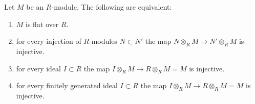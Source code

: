 \begin{lemma}
\label{lemma-flat}
Let $M$ be an $R$-module. The following are equivalent:
\begin{enumerate}
\item
\label{item-flat}
$M$ is flat over $R$.
\item
\label{item-injective}
for every injection of $R$-modules $N \subset N'$
the map $N \otimes_R M \to N'\otimes_R M$ is injective.
\item
\label{item-f-ideal}
for every ideal $I \subset R$ the map
$I \otimes_R M \to R \otimes_R M = M$ is injective.
\item
\label{item-ffg-ideal}
for every finitely generated ideal $I \subset R$
the map $I \otimes_R M \to R \otimes_R M = M$ is injective.
\end{enumerate}
\end{lemma}

